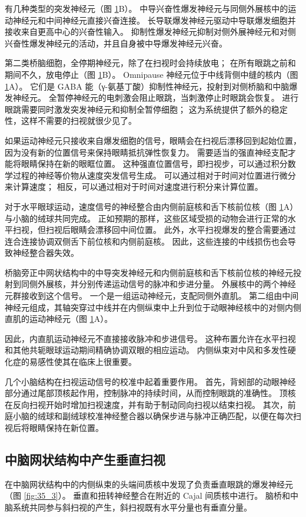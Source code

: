 \begin{figure}[htbp]
	\label{fig:35_8}
\end{figure}

有几种类型的突发神经元（图 \ref{fig:35_8}B）。 中导兴奋性爆发神经元与同侧外展核中的运动神经元和中间神经元直接兴奋连接。 长导联爆发神经元驱动中导联爆发细胞并接收来自更高中心的兴奋性输入。 抑制性爆发神经元抑制对侧外展神经元和对侧兴奋性爆发神经元的活动，并且自身被中导爆发神经元兴奋。

第二类桥脑细胞，全停期神经元，除了在扫视时会持续放电； 在所有眼跳之前和期间不久，放电停止（图 \ref{fig:35_8}B）。 Omnipause 神经元位于中线背侧中缝的核内（图 \ref{fig:35_8}A）。 它们是 GABA 能（γ-氨基丁酸）抑制性神经元，投射到对侧桥脑和中脑爆发神经元。 全暂停神经元的电刺激会阻止眼跳，当刺激停止时眼跳会恢复。 进行眼跳需要同时激发突发神经元和抑制全暂停细胞； 这为系统提供了额外的稳定性，这样不需要的扫视就很少见了。

如果运动神经元只接收来自爆发细胞的信号，眼睛会在扫视后漂移回到起始位置，因为没有新的位置信号来保持眼睛抵抗弹性恢复力。 需要适当的强直神经支配才能将眼睛保持在新的眼眶位置。 这种强直位置信号，即扫视步，可以通过积分数学过程的神经等价物从速度突发信号生成。 可以通过相对于时间对位置进行微分来计算速度； 相反，可以通过相对于时间对速度进行积分来计算位置。

对于水平眼球运动，速度信号的神经整合由内侧前庭核和舌下核前位核（图 \ref{fig:35_8}A）与小脑的绒球共同完成。 正如预期的那样，这些区域受损的动物会进行正常的水平扫视，但扫视后眼睛会漂移回中间位置。 此外，水平扫视爆发的整合需要通过连合连接协调双侧舌下前位核和内侧前庭核。 因此，这些连接的中线损伤也会导致神经整合器失效。

桥脑旁正中网状结构中的中导突发神经元和内侧前庭核和舌下核前位核的神经元投射到同侧外展核，并分别传递运动信号的脉冲和步进分量。 外展核中的两个神经元群接收到这个信号。 一个是一组运动神经元，支配同侧外直肌。 第二组由中间神经元组成，其轴突穿过中线并在内侧纵束中上升到位于动眼神经核中的对侧内侧直肌的运动神经元（图 \ref{fig:35_8}A）。

因此，内直肌运动神经元不直接接收脉冲和步进信号。 这种布置允许在水平扫视和其他共轭眼球运动期间精确协调双眼的相应运动。 内侧纵束对中风和多发性硬化症的易感性使其在临床上很重要。

几个小脑结构在扫视运动信号的校准中起着重要作用。 首先，背蚓部的动眼神经部分通过尾部顶核起作用，控制脉冲的持续时间，从而控制眼跳的准确性。 顶核在反向扫视开始时增加扫视速度，并有助于制动同向扫视以结束扫视。 其次，前庭小脑的绒球和副绒球校准神经整合器以确保步进与脉冲正确匹配，以便在每次扫视后将眼睛保持在新位置。


\subsection{中脑网状结构中产生垂直扫视}
在中脑网状结构中的内侧纵束的头端间质核中发现了负责垂直眼跳的爆发神经元（图 \ref{fig:35_3}）。 垂直和扭转神经整合在附近的 Cajal 间质核中进行。 脑桥和中脑系统共同参与斜扫视的产生，斜扫视既有水平分量也有垂直分量。

